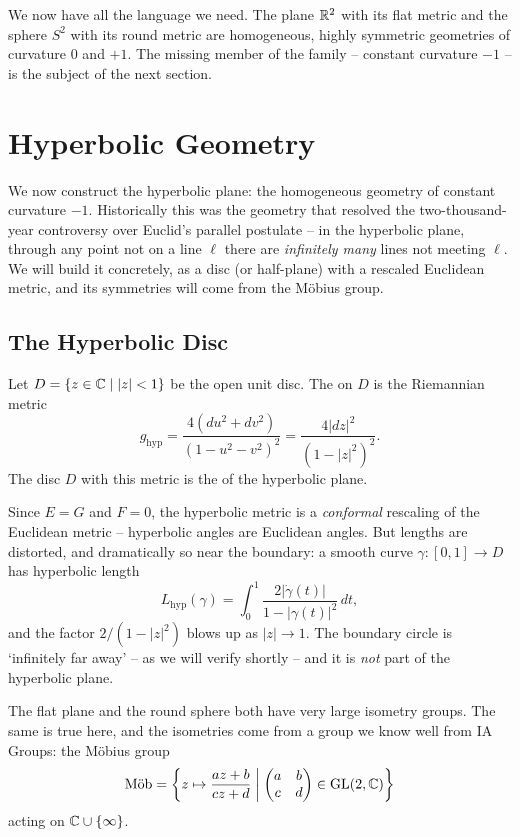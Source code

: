 \documentclass[a4paper]{scrartcl}
\newcommand{\Mob}{\text{M\"ob}}
\begin{document}
We now have all the language we need. The plane $\mathbb{R}^2$ with its flat metric and the sphere $S^2$ with its round metric are homogeneous, highly symmetric geometries of curvature $0$ and $+1$. The missing member of the family -- constant curvature $-1$ -- is the subject of the next section.

\section{Hyperbolic Geometry}

We now construct the hyperbolic plane: the homogeneous geometry of constant curvature $-1$. Historically this was the geometry that resolved the two-thousand-year controversy over Euclid's parallel postulate -- in the hyperbolic plane, through any point not on a line $\ell$ there are \emph{infinitely many} lines not meeting $\ell$. We will build it concretely, as a disc (or half-plane) with a rescaled Euclidean metric, and its symmetries will come from the M\"obius group.

\subsection{The Hyperbolic Disc}

\begin{definition}
    Let $D = \{z \in \mathbb{C} \mid |z| < 1\}$ be the open unit disc. The  on $D$ is the Riemannian metric
    $$
    g_{\mathrm{hyp}} = \frac{4 (du^2 + dv^2)}{(1 - u^2 - v^2)^2} = \frac{4|dz|^2}{(1 - |z|^2)^2}.
    $$
    The disc $D$ with this metric is the  of the hyperbolic plane.
\end{definition}

Since $E = G$ and $F = 0$, the hyperbolic metric is a \emph{conformal} rescaling of the Euclidean metric -- hyperbolic angles are Euclidean angles. But lengths are distorted, and dramatically so near the boundary: a smooth curve $\gamma: [0,1] \rightarrow D$ has hyperbolic length
$$
L_{\mathrm{hyp}}(\gamma) = \int_0^1 \frac{2 |\dot\gamma(t)|}{1 - |\gamma(t)|^2}\, dt,
$$
and the factor $2/(1 - |z|^2)$ blows up as $|z| \rightarrow 1$. The boundary circle is `infinitely far away' -- as we will verify shortly -- and it is \emph{not} part of the hyperbolic plane.

The flat plane and the round sphere both have very large isometry groups. The same is true here, and the isometries come from a group we know well from IA Groups: the M\"obius group
$$
\Mob = \left\{z \mapsto \frac{az + b}{cz + d} \;\middle|\; \begin{pmatrix} a & b \\ c & d\end{pmatrix} \in \GL(2, \C)\right\}
$$
acting on $\mathbb{C} \cup \{\infty\}$.
\end{document}
